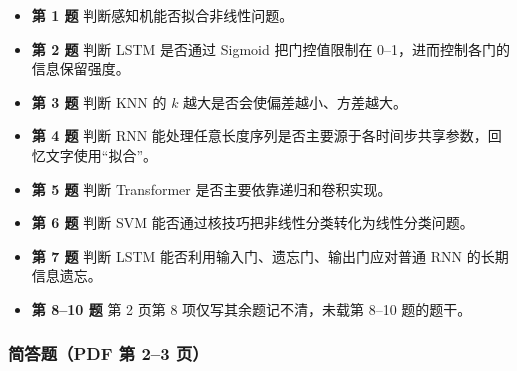 \documentclass[UTF8,a4paper,zihao=-4,fontset=fandol]{ctexart}
\begin{document}
\begin{itemize}
\item \textbf{第 1 题} 判断感知机能否拟合非线性问题。
\item \textbf{第 2 题} 判断 LSTM 是否通过 Sigmoid 把门控值限制在 0–1，进而控制各门的信息保留强度。
\item \textbf{第 3 题} 判断 KNN 的 $k$ 越大是否会使偏差越小、方差越大。
\item \textbf{第 4 题} 判断 RNN 能处理任意长度序列是否主要源于各时间步共享参数，回忆文字使用“拟合”。
\item \textbf{第 5 题} 判断 Transformer 是否主要依靠递归和卷积实现。
\item \textbf{第 6 题} 判断 SVM 能否通过核技巧把非线性分类转化为线性分类问题。
\item \textbf{第 7 题} 判断 LSTM 能否利用输入门、遗忘门、输出门应对普通 RNN 的长期信息遗忘。
\item \textbf{第 8–10 题} 第 2 页第 8 项仅写其余题记不清，未载第 8–10 题的题干。
\end{itemize}

\subsubsection{简答题（PDF 第 2–3 页）}
\end{document}
